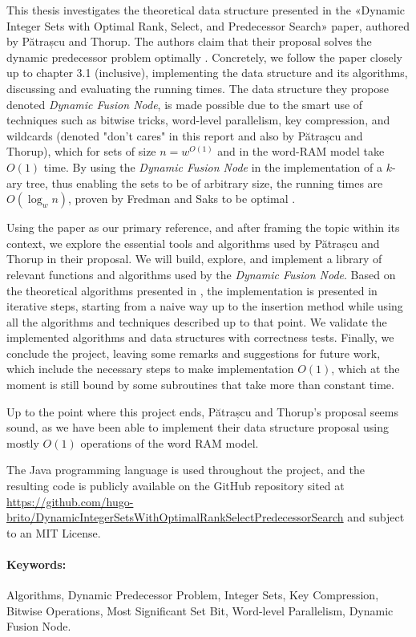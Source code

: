 
This thesis investigates the theoretical data structure presented in the «Dynamic Integer Sets with Optimal Rank, Select, and Predecessor Search» paper, authored by Pătrașcu and Thorup.
The authors claim that their proposal solves the dynamic predecessor problem optimally \cite{patrascu2014dynamic}.
Concretely, we follow the paper closely up to chapter 3.1 (inclusive), implementing the data structure and its algorithms, discussing and evaluating the running times.
The data structure they propose denoted \textit{Dynamic Fusion Node}, is made possible due to the smart use of techniques such as bitwise tricks, word-level parallelism, key compression, and wildcards (denoted "don't cares" in this report and also by Pătrașcu and Thorup), which for sets of size $n = w^{O(1)}$ and in the word-RAM model take $O(1)$ time.
By using the \textit{Dynamic Fusion Node} in the implementation of a $k$-ary tree, thus enabling the sets to be of arbitrary size, the running times are $O(\log_w n)$, proven by Fredman and Saks to be optimal \cite{fredman1989cell}.

Using the \cite{patrascu2014dynamic} paper as our primary reference, and after framing the topic within its context, we explore the essential tools and algorithms used by Pătrașcu and Thorup in their proposal.
We will build, explore, and implement a library of relevant functions and algorithms used by the \textit{Dynamic Fusion Node}.
Based on the theoretical algorithms presented in \cite{patrascu2014dynamic}, the implementation is presented in iterative steps, starting from a naive way up to the insertion method while using all the algorithms and techniques described up to that point.
We validate the implemented algorithms and data structures with correctness tests.
Finally, we conclude the project, leaving some remarks and suggestions for future work, which include the necessary steps to make implementation $O(1)$, which at the moment is still bound by some subroutines that take more than constant time.

Up to the point where this project ends, Pătrașcu and Thorup's proposal seems sound, as we have been able to implement their data structure proposal using mostly $O(1)$ operations of the word RAM model.

The Java programming language is used throughout the project, and the resulting code is publicly available on the GitHub repository sited at \url{https://github.com/hugo-brito/DynamicIntegerSetsWithOptimalRankSelectPredecessorSearch} and subject to an MIT License.

\paragraph*{Keywords:} Algorithms, Dynamic Predecessor Problem, Integer Sets, Key Compression, Bitwise Operations, Most Significant Set Bit, Word-level Parallelism, Dynamic Fusion Node.